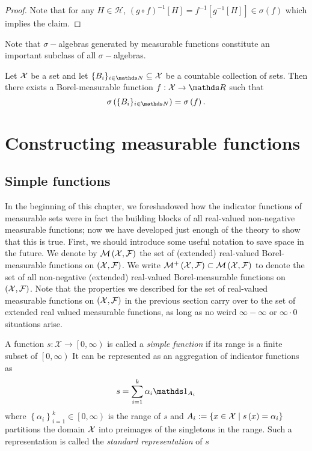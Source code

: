 \begin{proof}
Note that for any $H\in\mathcal{H}$, $\left(g\circ f\right)^{-1}\left[H\right]=f^{-1}\left[g^{-1}\left[H\right]\right]\in\sigma\left(f\right)$
which implies the claim.
\end{proof}
Note that $\sigma-$algebras generated by measurable functions constitute
an important subclass of all $\sigma-$algebras.
\begin{prop}
\label{prop:countablyGeneratedSigmaAlgebrasMeasFunc}Let $\mathcal{X}$ be
a set and let $\{B_{i}\}_{i\in\N}\subseteq\X$ be a countable collection
of sets. Then there exists a Borel-measurable function $f:\X\to\R$
such that 
\[
\sigma\left(\{B_{i}\}_{i\in\N}\right)=\sigma\left(f\right).
\]
\end{prop}


\section{Constructing measurable functions}

\subsection{Simple functions}

In the beginning of this chapter, we foreshadowed how the indicator
functions of measurable sets were in fact the building blocks of all
real-valued non-negative measurable functions; now we have developed
just enough of the theory to show that this is true. First, we should
introduce some useful notation to save space in the future. We denote
by $\mathcal{M}\left(\mathcal{X},\mathcal{F}\right)$ the set of (extended)
real-valued Borel-measurable functions on $\left(\mathcal{X},\mathcal{F}\right)$.
We write $\mathcal{M}^{+}\left(\mathcal{X},\mathcal{F}\right)\subset\mathcal{M}\left(\mathcal{X},\mathcal{F}\right)$
to denote the set of all non-negative (extended) real-valued Borel-measurable
functions on $\left(\mathcal{X},\mathcal{F}\right)$. Note that the properties
we described for the set of real-valued measurable functions on $\left(\mathcal{X},\mathcal{F}\right)$
in the previous section carry over to the set of extended real valued
measurable functions, as long as no weird $\infty-\infty$ or $\infty\cdot0$
situations arise.
\begin{defn}
\label{def:simpleFunction} A function $s:\mathcal{X}\longrightarrow\left[0,\infty\right)$
is called a \emph{simple function }if its range is a finite subset
of $\left[0,\infty\right)$ It can be represented as an aggregation
of indicator functions as
\[
s=\sum_{i=1}^{k}\alpha_{i}\indicate_{A_{i}}
\]
where $\left\{ \alpha_{i}\right\} _{i=1}^{k}\in\left[0,\infty\right)$
is the range of $s$ and $A_{i}:=\left\{ x\in\mathcal{X}\mid s\left(x\right)=\alpha_{i}\right\} $
partitions the domain $\mathcal{X}$ into preimages of the singletons in the
range. Such a representation is called the \emph{standard representation
}of $s$
\end{defn}

